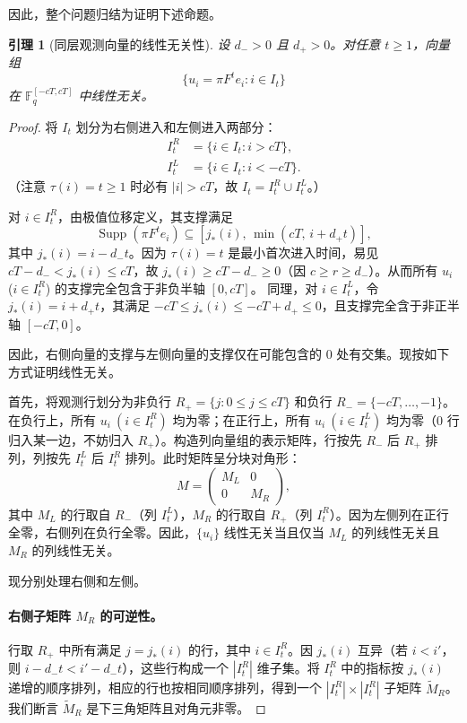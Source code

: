 \documentclass[11pt,a4paper]{ctexart}
\newtheorem{lemma}[theorem]{引理}
\newcommand{\F}{\mathbb{F}}
\DeclareMathOperator{\Supp}{Supp}
\begin{document}
因此，整个问题归结为证明下述命题。

\begin{lemma}[同层观测向量的线性无关性]\label{lem:indep}
设 \(d_->0\) 且 \(d_+>0\)。对任意 \(t\ge 1\)，向量组
\[
  \{u_i = \pi F^t e_i : i\in I_t\}
\]
在 \(\F_q^{[-cT,cT]}\) 中线性无关。
\end{lemma}

\begin{proof}
将 \(I_t\) 划分为右侧进入和左侧进入两部分：
\begin{align*}
  I_t^R &= \{i\in I_t : i > cT\},\\
  I_t^L &= \{i\in I_t : i < -cT\}.
\end{align*}
（注意 \(\tau(i)=t\ge 1\) 时必有 \(|i|>cT\)，故 \(I_t=I_t^R\cup I_t^L\)。）

对 \(i\in I_t^R\)，由极值位移定义，其支撑满足
\[
  \Supp(\pi F^t e_i) \subseteq [j_*(i),\, \min(cT,\, i+d_+t)],
\]
其中 \(j_*(i)=i-d_-t\)。因为 \(\tau(i)=t\) 是最小首次进入时间，易见 \(cT-d_- < j_*(i)\le cT\)，故 \(j_*(i)\ge cT-d_- \ge 0\)（因 \(c\ge r\ge d_-\)）。从而所有 \(u_i\) (\(i\in I_t^R\)) 的支撑完全包含于非负半轴 \([0,cT]\)。
同理，对 \(i\in I_t^L\)，令 \(j_*(i)=i+d_+t\)，其满足 \(-cT\le j_*(i)\le -cT+d_+ \le 0\)，且支撑完全含于非正半轴 \([-cT,0]\)。

因此，右侧向量的支撑与左侧向量的支撑仅在可能包含的 \(0\) 处有交集。现按如下方式证明线性无关。

首先，将观测行划分为非负行 \(R_+=\{j:0\le j\le cT\}\) 和负行 \(R_-=\{-cT,\dots,-1\}\)。在负行上，所有 \(u_i\ (i\in I_t^R)\) 均为零；在正行上，所有 \(u_i\ (i\in I_t^L)\) 均为零（0 行归入某一边，不妨归入 \(R_+\)）。构造列向量组的表示矩阵，行按先 \(R_-\) 后 \(R_+\) 排列，列按先 \(I_t^L\) 后 \(I_t^R\) 排列。此时矩阵呈分块对角形：
\[
  M = \begin{pmatrix}
    M_L & 0 \\[2pt]
    0 & M_R
  \end{pmatrix},
\]
其中 \(M_L\) 的行取自 \(R_-\)（列 \(I_t^L\)），\(M_R\) 的行取自 \(R_+\)（列 \(I_t^R\)）。因为左侧列在正行全零，右侧列在负行全零。因此，\(\{u_i\}\) 线性无关当且仅当 \(M_L\) 的列线性无关且 \(M_R\) 的列线性无关。

现分别处理右侧和左侧。
\paragraph{右侧子矩阵 \(M_R\) 的可逆性。}
行取 \(R_+\) 中所有满足 \(j=j_*(i)\) 的行，其中 \(i\in I_t^R\)。因 \(j_*(i)\) 互异（若 \(i<i'\)，则 \(i-d_-t < i'-d_-t\)），这些行构成一个 \(|I_t^R|\) 维子集。将 \(I_t^R\) 中的指标按 \(j_*(i)\) 递增的顺序排列，相应的行也按相同顺序排列，得到一个 \(|I_t^R|\times |I_t^R|\) 子矩阵 \(\tilde M_R\)。我们断言 \(\tilde M_R\) 是下三角矩阵且对角元非零。


\end{proof}
\end{document}
